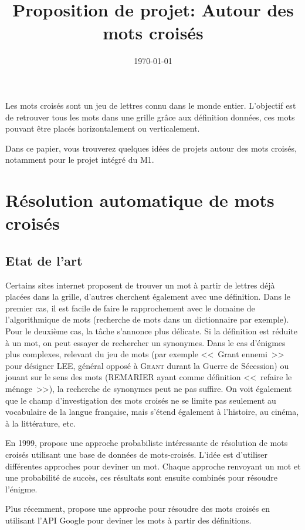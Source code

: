 \documentclass{article}
\title{Proposition de projet: Autour des mots croisés}
\author{}
\date{\today}
\begin{document}
\maketitle

Les mots croisés sont un jeu de lettres connu dans le monde entier. L'objectif est de retrouver tous les mots dans une grille grâce aux définition données, ces mots pouvant être placés horizontalement ou verticalement.

Dans ce papier, vous trouverez quelques idées de projets autour des mots croisés, notamment pour le projet intégré du M1.

\section{Résolution automatique de mots croisés}

\subsection{Etat de l'art}

Certains sites internet proposent de trouver un mot à partir de lettres déjà placées dans la grille, d'autres cherchent également avec une définition. Dans le premier cas, il est facile de faire le rapprochement avec le domaine de l'algorithmique de mots (recherche de mots dans un dictionnaire par exemple). Pour le deuxième cas, la tâche s'annonce plus délicate. Si la définition est réduite à un mot, on peut essayer de rechercher un synonymes. Dans le cas d'énigmes plus complexes, relevant du jeu de mots (par exemple <<~Grant ennemi~>> pour désigner LEE, général opposé à \textsc{Grant} durant la Guerre de Sécession) ou jouant sur le sens des mots (REMARIER ayant comme définition <<~refaire le ménage~>>), la recherche de synonymes peut ne pas suffire. On voit également que le champ d'investigation des mots croisés ne se limite pas seulement au vocabulaire de la langue française, mais s'étend également à l'histoire, au cinéma, à la littérature, etc.

En 1999, \cite{proverb} propose une approche probabiliste intéressante de résolution de mots croisés utilisant une base de données de mots-croisés. L'idée est d'utiliser différentes approches pour deviner un mot. Chaque approche renvoyant un mot et une probabilité de succès, ces résultats sont ensuite combinés pour résoudre l'énigme.

Plus récemment, \cite{GCV} propose une approche pour résoudre des mots croisés en utilisant l'API Google pour deviner les mots à partir des définitions.
\end{document}
